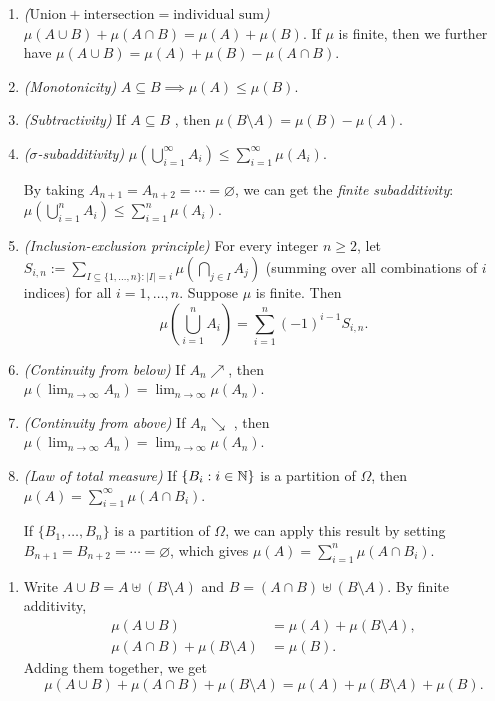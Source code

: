 \begin{enumerate}
\begin{enumerate}
\item \label{it:union-plus-int} \emph{(\(\text{Union}+\text{intersection}=\text{individual sum}\))}
\(\mu(A\cup B)+\mu(A\cap B)=\mu(A)+\mu(B)\). If \(\mu\) is finite, then
we further have \(\mu(A\cup B)=\mu(A)+\mu(B)-\mu(A\cap B)\).
\item \emph{(Monotonicity)} \(A\subseteq B\implies \mu(A)\le\mu(B)\).
\item \emph{(Subtractivity)} If \(A\subseteq B\) ,
then \(\mu(B\setminus A)=\mu(B)-\mu(A)\).
\item \emph{(\(\sigma\)-subadditivity)}
\(\mu(\bigcup_{i=1}^{\infty}A_i)\le\sum_{i=1}^{\infty}\mu(A_i)\).
\begin{note}
By taking \(A_{n+1}=A_{n+2}=\dotsb=\varnothing\), we can get the
\emph{finite subadditivity}: \(\mu(\bigcup_{i=1}^{n}A_i)\le\sum_{i=1}^{n}\mu(A_i)\).
\end{note}
\item \emph{(Inclusion-exclusion principle)} For every integer \(n\ge 2\), let
\(S_{i,n}:=\sum_{I\subseteq \{1,\dotsc,n\}: |I|=i}^{}\mu(\bigcap_{j\in
I}^{}A_j)\) (summing over all combinations of \(i\) indices) for all
\(i=1,\dotsc,n\). Suppose \(\mu\) is finite. Then
\[
\mu\left(\bigcup_{i=1}^{n}A_i\right)
=\sum_{i=1}^{n}(-1)^{i-1}S_{i,n}.
\]
\item \emph{(Continuity from below)} If \(A_n\nearrow\), then
\(\mu(\lim_{n\to\infty}A_n)=\lim_{n\to\infty}\mu(A_n)\).
\item \emph{(Continuity from above)} If \(A_n\searrow\) , then
\(\mu(\lim_{n\to\infty}A_n)=\lim_{n\to\infty}\mu(A_n)\).
\item \emph{(Law of total measure)} If \(\{B_{i}:i\in\mathbb{N}\}\) is a partition of
\(\Omega\), then \(\mu(A)=\sum_{i=1}^{\infty}\mu(A\cap B_i)\).
\begin{note}
If \(\{B_1,\dotsc,B_n\}\) is a partition of \(\Omega\), we can apply this
result by setting \(B_{n+1}=B_{n+2}=\dotsb=\varnothing\), which gives
\(\mu(A)=\sum_{i=1}^{n}\mu(A\cap B_i)\).
\end{note}
\end{enumerate}
\begin{pf}
\begin{enumerate}
\item Write \(A\cup B=A\uplus (B\setminus A)\) and \(B=(A\cap
B)\uplus (B\setminus A)\). By finite additivity,
\begin{align}
\label{eq:mu-acupb}\mu(A\cup B)&=\mu(A)+\mu(B\setminus A), \\
\label{eq:mu-b}\mu(A\cap B)+\mu(B\setminus A)&=\mu(B).
\end{align}
Adding them together, we get
\begin{equation}
\label{eq:three-term-eq}
\mu(A\cup B)+\mu(A\cap B)+\mu(B\setminus A)
=\mu(A)+\mu(B\setminus A)+\mu(B).
\end{equation}


\end{enumerate}
\end{pf}
\end{enumerate}

